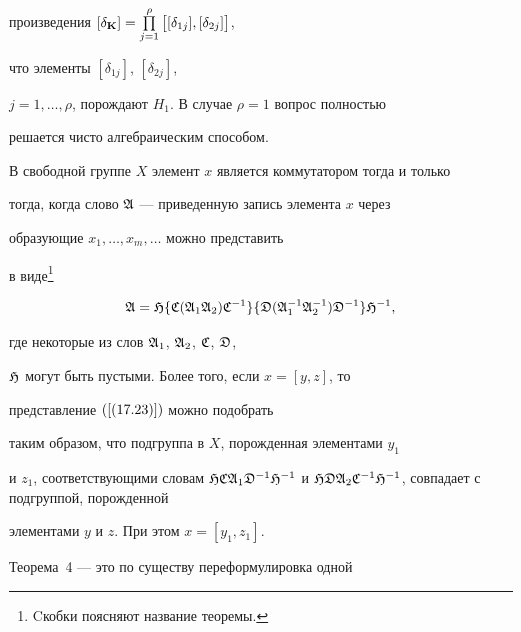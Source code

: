 произведения $[\delta_{\bold K}]=\PL_{{j=1}}^\rho\big[


[\delta_{1j}],[\delta_{2j}]\big]$,


что элементы $[\delta_{1j}]$, $[\delta_{2j}]$,


$j=1,\dotsc,\rho$, порождают $H_1$. В случае $\rho=1$ вопрос полностью 


решается чисто алгебраическим способом.





\begin{thm}


В свободной группе $X$ элемент $x$ является коммутатором тогда и только


тогда, когда слово $\frak A$ --- приведенную запись элемента $x$ через


образующие $x_1,\dotsc,x_{{m}},\dotsc$ можно представить


в виде\footnote{Cкобки поясняют название теоремы.}


\begin{equation}


\frak A=\frak H \{\frak C(\frak A_1\frak A_2)\frak C^{-1}\}


\{\frak D (\frak A^{-1}_1\frak A^{-1}_2)\frak D^{-1}\}\frak H^{-1},


\label{(17.23)}


\end{equation}


где некоторые из слов $\frak A_1$, $\frak A_2$, $\frak C$, $\frak D$,


$\frak H$ могут быть пустыми. Более того, если $x=[y,z]$, то 


представление $(\ref{(17.23)})$ можно подобрать


таким образом, что подгруппа в $X$, порожденная элементами $y_1$


и $z_1$, соответствующими словам $\frak H\frak C\frak A_1


\frak D^{-1}\frak H^{-1}$ и $\frak H \frak D\frak A_2\frak C^{-1}


\frak H^{-1}$, совпадает с подгруппой, порожденной 


элементами $y$ и $z$. При этом $x=[y_1,z_1]$.


\end{thm}





Теорема~4 --- это по существу переформулировка одной


